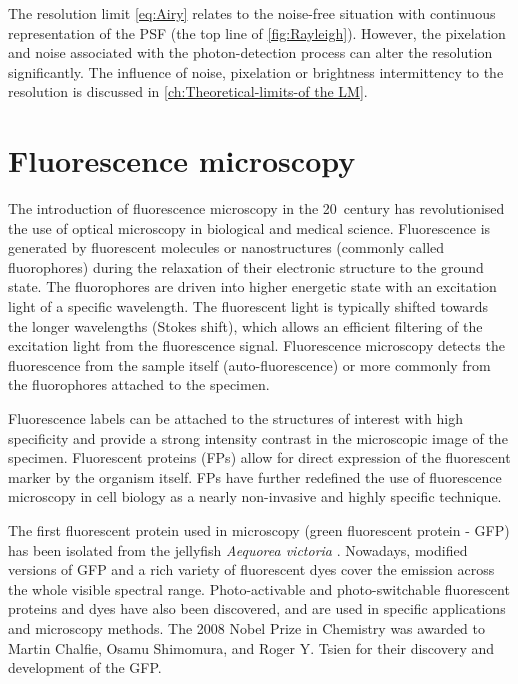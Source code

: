 The resolution limit \autoref{eq:Airy} relates to the noise-free situation with continuous representation of the PSF (the top line of \autoref{fig:Rayleigh}). However, the pixelation and noise associated with the photon-detection process can alter the resolution significantly. The influence of noise, pixelation or brightness intermittency to the resolution is discussed in \autoref{ch:Theoretical-limits-of the LM}. 


\section{Fluorescence microscopy\label{sec:Fluorescence microscopy}}

The introduction of fluorescence microscopy in the 20\ths\ century has revolutionised the use of optical microscopy in biological and medical science. Fluorescence is generated by fluorescent molecules or nanostructures (commonly called fluorophores) during the relaxation of their electronic structure to the ground state.  The fluorophores are driven into higher energetic state with an excitation light of a specific wavelength. The fluorescent light is typically shifted towards the longer wavelengths (Stokes shift),  which allows an efficient filtering of the excitation light from the fluorescence signal. Fluorescence microscopy detects the fluorescence from the sample itself (auto-fluorescence) or more commonly from the fluorophores attached to the specimen.

Fluorescence labels can be attached to the structures of interest with high specificity and provide a strong intensity contrast in the microscopic image of the specimen. Fluorescent proteins (FPs) allow for direct expression of the fluorescent marker by the organism itself. FPs have further redefined the use of fluorescence microscopy in cell biology as a nearly non-invasive and highly specific technique. 

The first fluorescent protein used in microscopy (green fluorescent protein - GFP) has been isolated from the jellyfish {\it Aequorea victoria} \cite{Tsien1998}. Nowadays, modified versions of GFP and a rich variety of fluorescent dyes cover the emission across the whole visible spectral range. Photo-activable and photo-switchable fluorescent proteins and dyes have also been discovered, and are used in specific applications and microscopy methods. The 2008 Nobel Prize in Chemistry was awarded to Martin Chalfie, Osamu Shimomura, and Roger Y. Tsien for their discovery and development of the GFP.
 
